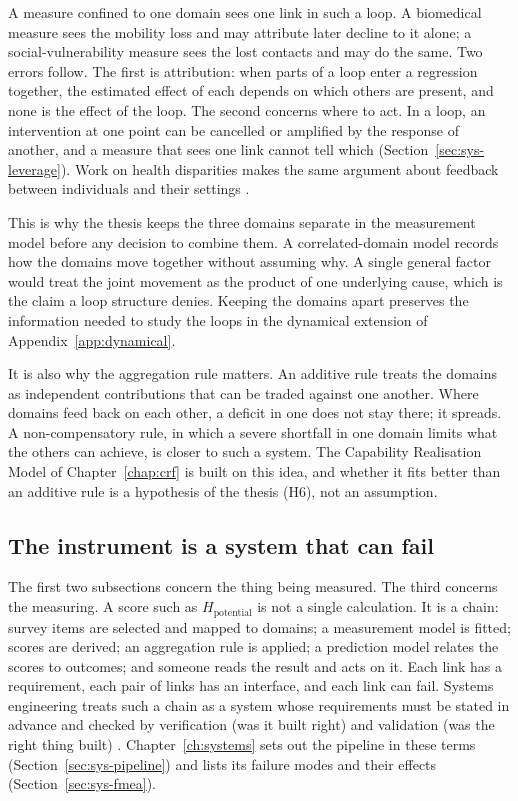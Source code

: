 A measure confined to one domain sees one link in such a loop. A biomedical measure sees the mobility loss and may attribute later decline to it alone; a social-vulnerability measure sees the lost contacts and may do the same. Two errors follow. The first is attribution: when parts of a loop enter a regression together, the estimated effect of each depends on which others are present, and none is the effect of the loop. The second concerns where to act. In a loop, an intervention at one point can be cancelled or amplified by the response of another, and a measure that sees one link cannot tell which (Section~\ref{sec:sys-leverage}). Work on health disparities makes the same argument about feedback between individuals and their settings \citep{diez_roux_2011}.

This is why the thesis keeps the three domains separate in the measurement model before any decision to combine them. A correlated-domain model records how the domains move together without assuming why. A single general factor would treat the joint movement as the product of one underlying cause, which is the claim a loop structure denies. Keeping the domains apart preserves the information needed to study the loops in the dynamical extension of Appendix~\ref{app:dynamical}.

It is also why the aggregation rule matters. An additive rule treats the domains as independent contributions that can be traded against one another. Where domains feed back on each other, a deficit in one does not stay there; it spreads. A non-compensatory rule, in which a severe shortfall in one domain limits what the others can achieve, is closer to such a system. The Capability Realisation Model of Chapter~\ref{chap:crf} is built on this idea, and whether it fits better than an additive rule is a hypothesis of the thesis (H6), not an assumption.

\subsection{The instrument is a system that can fail}

The first two subsections concern the thing being measured. The third concerns the measuring. A score such as $H_{\text{potential}}$ is not a single calculation. It is a chain: survey items are selected and mapped to domains; a measurement model is fitted; scores are derived; an aggregation rule is applied; a prediction model relates the scores to outcomes; and someone reads the result and acts on it. Each link has a requirement, each pair of links has an interface, and each link can fail. Systems engineering treats such a chain as a system whose requirements must be stated in advance and checked by verification (was it built right) and validation (was the right thing built) \citep{incose_2015}. Chapter~\ref{ch:systems} sets out the pipeline in these terms (Section~\ref{sec:sys-pipeline}) and lists its failure modes and their effects (Section~\ref{sec:sys-fmea}).

